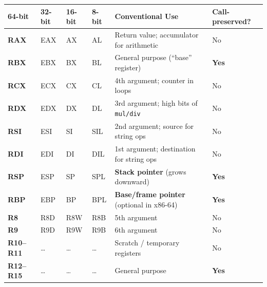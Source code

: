 \documentclass[11pt, letterpaper]{article}
\begin{document}
\noindent
{\small\renewcommand{\arraystretch}{1.5}
\begin{tabularx}{\textwidth}{>{\ttfamily\bfseries\centering\arraybackslash}p{1.4cm}
                              >{\ttfamily\centering\arraybackslash}p{1.4cm}
                              >{\ttfamily\centering\arraybackslash}p{1.4cm}
                              >{\ttfamily\centering\arraybackslash}p{1.4cm}
                              >{\raggedright\arraybackslash}X
                              >{\centering\arraybackslash}p{2cm}}
\toprule
\rowcolor{tableheaderred}
\textbf{64-bit} & \textbf{32-bit} & \textbf{16-bit} & \textbf{8-bit} & \textbf{Conventional Use} & \textbf{Call-preserved?} \\
\midrule
\rowcolor{rowRe} RAX & EAX & AX  & AL  & Return value; accumulator for arithmetic      & No \\
\rowcolor{rowA}  RBX & EBX & BX  & BL  & General purpose (``base'' register)            & \textbf{Yes} \\
\rowcolor{rowRe} RCX & ECX & CX  & CL  & 4th argument; counter in loops                 & No \\
\rowcolor{rowA}  RDX & EDX & DX  & DL  & 3rd argument; high bits of \texttt{mul/div}    & No \\
\rowcolor{rowRe} RSI & ESI & SI  & SIL & 2nd argument; source for string ops            & No \\
\rowcolor{rowA}  RDI & EDI & DI  & DIL & 1st argument; destination for string ops       & No \\
\rowcolor{rowRe} RSP & ESP & SP  & SPL & \textbf{Stack pointer} (grows downward)        & \textbf{Yes} \\
\rowcolor{rowA}  RBP & EBP & BP  & BPL & \textbf{Base/frame pointer} (optional in x86-64) & \textbf{Yes} \\
\rowcolor{rowRe} R8  & R8D & R8W & R8B & 5th argument                                   & No \\
\rowcolor{rowA}  R9  & R9D & R9W & R9B & 6th argument                                   & No \\
\rowcolor{rowRe} R10--R11 & \ldots & \ldots & \ldots & Scratch / temporary registers           & No \\
\rowcolor{rowA}  R12--R15 & \ldots & \ldots & \ldots & General purpose                         & \textbf{Yes} \\
\bottomrule
\end{tabularx}}
\end{document}
